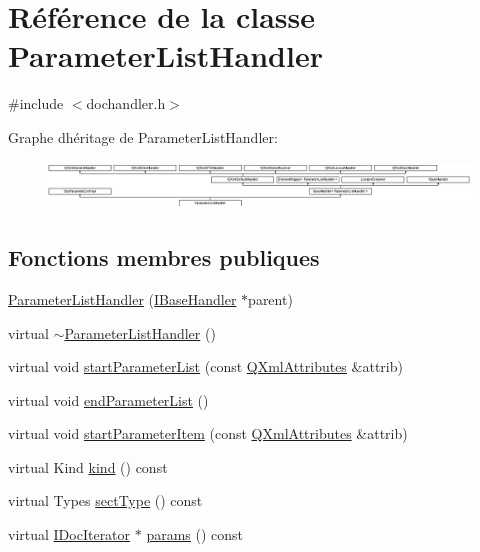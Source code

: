 \hypertarget{class_parameter_list_handler}{}\section{Référence de la classe Parameter\+List\+Handler}
\label{class_parameter_list_handler}


{\ttfamily \#include $<$dochandler.\+h$>$}

Graphe d\textquotesingle{}héritage de Parameter\+List\+Handler\+:\begin{figure}[H]
\begin{center}
\leavevmode
\includegraphics[height=1.259843cm]{class_parameter_list_handler}
\end{center}
\end{figure}
\subsection*{Fonctions membres publiques}
\begin{DoxyCompactItemize}
\item 
\hyperlink{class_parameter_list_handler_a79a402706d36c20d37f9c5084eb2e439}{Parameter\+List\+Handler} (\hyperlink{class_i_base_handler}{I\+Base\+Handler} $\ast$parent)
\item 
virtual \hyperlink{class_parameter_list_handler_a073d1c3c438c74ca8895a037dd29e49f}{$\sim$\+Parameter\+List\+Handler} ()
\item 
virtual void \hyperlink{class_parameter_list_handler_a3f090a9958cff69649191067a3ddcb10}{start\+Parameter\+List} (const \hyperlink{class_q_xml_attributes}{Q\+Xml\+Attributes} \&attrib)
\item 
virtual void \hyperlink{class_parameter_list_handler_a27531ce4c09e82b3748ae4ea08d691ef}{end\+Parameter\+List} ()
\item 
virtual void \hyperlink{class_parameter_list_handler_a6b5b525433062128616305f5016491b8}{start\+Parameter\+Item} (const \hyperlink{class_q_xml_attributes}{Q\+Xml\+Attributes} \&attrib)
\item 
virtual Kind \hyperlink{class_parameter_list_handler_a2fc789d98ab4ac7fa1db1baf9cf652b3}{kind} () const 
\item 
virtual Types \hyperlink{class_parameter_list_handler_af5a3884b2a3bf7b8132bb0ef3729831c}{sect\+Type} () const 
\item 
virtual \hyperlink{class_i_doc_iterator}{I\+Doc\+Iterator} $\ast$ \hyperlink{class_parameter_list_handler_a0c8b8107846359050354abd9fa0f8f65}{params} () const 
\end{DoxyCompactItemize}
